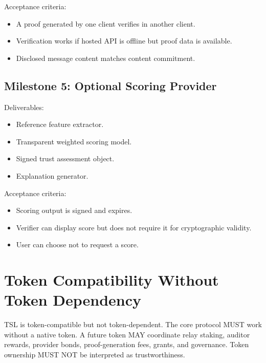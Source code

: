 \documentclass[11pt]{article}
\newcommand{\TSL}{\textsc{TSL}}
\begin{document}
Acceptance criteria:

\begin{itemize}
    \item A proof generated by one client verifies in another client.
    \item Verification works if hosted API is offline but proof data is available.
    \item Disclosed message content matches content commitment.
\end{itemize}

\subsection{Milestone 5: Optional Scoring Provider}

Deliverables:

\begin{itemize}
    \item Reference feature extractor.
    \item Transparent weighted scoring model.
    \item Signed trust assessment object.
    \item Explanation generator.
\end{itemize}

Acceptance criteria:

\begin{itemize}
    \item Scoring output is signed and expires.
    \item Verifier can display score but does not require it for cryptographic validity.
    \item User can choose not to request a score.
\end{itemize}

\section{Token Compatibility Without Token Dependency}

\TSL{} is token-compatible but not token-dependent. The core protocol MUST work without a native token. A future token MAY coordinate relay staking, auditor rewards, provider bonds, proof-generation fees, grants, and governance. Token ownership MUST NOT be interpreted as trustworthiness.
\end{document}
